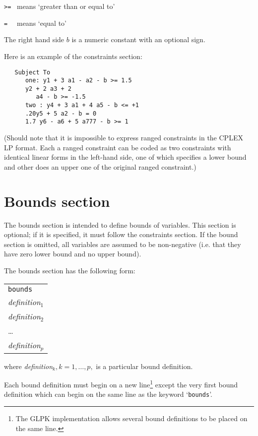 \verb|>=| \ means `greater than or equal to'

\verb|= | \ means `equal to'

The right hand side $b$ is a numeric constant with an optional sign.

Here is an example of the constraints section:

\begin{verbatim}
   Subject To
      one: y1 + 3 a1 - a2 - b >= 1.5
      y2 + 2 a3 + 2
         a4 - b >= -1.5
      two : y4 + 3 a1 + 4 a5 - b <= +1
      .20y5 + 5 a2 - b = 0
      1.7 y6 - a6 + 5 a777 - b >= 1
\end{verbatim}

(Should note that it is impossible to express ranged constraints in the
CPLEX LP format. Each a ranged constraint can be coded as two
constraints with identical linear forms in the left-hand side, one of
which specifies a lower bound and other does an upper one of the
original ranged constraint.)

\section{Bounds section}

The bounds section is intended to define bounds of variables. This
section is optional; if it is specified, it must follow the constraints
section. If the bound section is omitted, all variables are assumed to
be non-negative (i.e. that they have zero lower bound and no upper
bound).

The bounds section has the following form:

\begin{center}
\begin{tabular}{l}
\verb|bounds| \\
{\it definition}$_1$ \\
{\it definition}$_2$ \\
\hspace{20pt}\dots \\
{\it definition}$_p$ \\
\end{tabular}
\end{center}

\noindent
where {\it definition}$_k, k=1,\dots,p,$ is a particular bound
definition.

Each bound definition must begin on a new line\footnote{The GLPK
implementation allows several bound definitions to be placed on the same
line.} except the very first bound definition which can begin on the
same line as the keyword `\verb|bounds|'.

